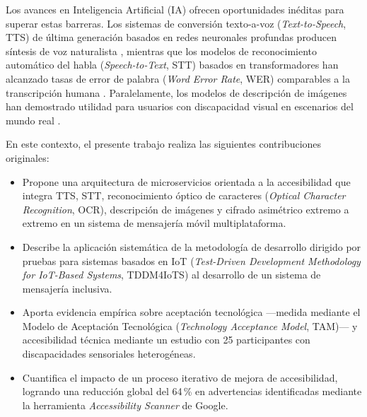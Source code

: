 \documentclass[journal]{IEEEtran}
\begin{document}
Los avances en Inteligencia Artificial (IA) ofrecen oportunidades in\'editas para superar estas barreras. Los sistemas de conversi\'on texto-a-voz (\textit{Text-to-Speech}, TTS) de \'ultima generaci\'on basados en redes neuronales profundas producen s\'intesis de voz naturalista \cite{tan2021}, mientras que los modelos de reconocimiento autom\'atico del habla (\textit{Speech-to-Text}, STT) basados en transformadores han alcanzado tasas de error de palabra (\textit{Word Error Rate}, WER) comparables a la transcripci\'on humana \cite{baevski2020}. Paralelamente, los modelos de descripci\'on de im\'agenes han demostrado utilidad para usuarios con discapacidad visual en escenarios del mundo real \cite{dognin2021}.

En este contexto, el presente trabajo realiza las siguientes contribuciones originales:
\begin{itemize}
    \item Propone una arquitectura de microservicios orientada a la accesibilidad que integra TTS, STT, reconocimiento \'optico de caracteres (\textit{Optical Character Recognition}, OCR), descripci\'on de im\'agenes y cifrado asim\'etrico extremo a extremo en un sistema de mensajer\'ia m\'ovil multiplataforma.
    \item Describe la aplicaci\'on sistem\'atica de la metodolog\'ia de desarrollo dirigido por pruebas para sistemas basados en IoT (\textit{Test-Driven Development Methodology for IoT-Based Systems}, TDDM4IoTS) \cite{guerrero2020} al desarrollo de un sistema de mensajer\'ia inclusiva.
    \item Aporta evidencia emp\'irica sobre aceptaci\'on tecnol\'ogica ---medida mediante el Modelo de Aceptaci\'on Tecnol\'ogica (\textit{Technology Acceptance Model}, TAM)--- y accesibilidad t\'ecnica mediante un estudio con 25 participantes con discapacidades sensoriales heterog\'eneas.
    \item Cuantifica el impacto de un proceso iterativo de mejora de accesibilidad, logrando una reducci\'on global del 64\,\% en advertencias identificadas mediante la herramienta \textit{Accessibility Scanner} de Google.
\end{itemize}
\end{document}
